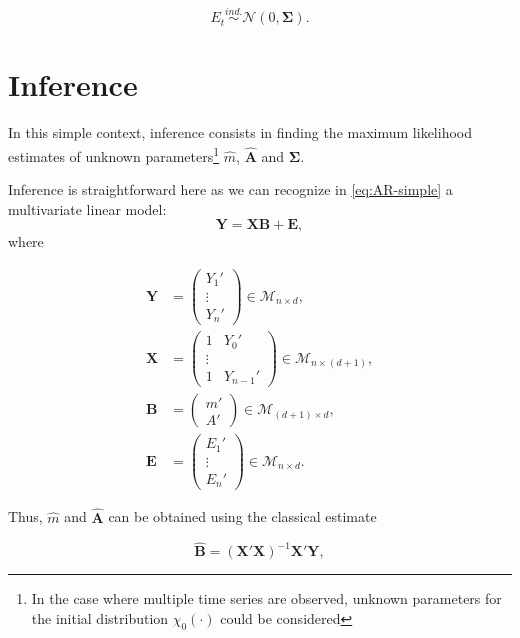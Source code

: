 \documentclass[]{book}
\begin{document}
\begin{equation*}
E_t \overset{ind.}{\sim} \mathcal{N}\left(0, \mathbf{\Sigma}\right).
\end{equation*}

\section{Inference}\label{inference}

In this simple context, inference consists in finding the maximum
likelihood estimates of unknown
parameters\footnote{In the case where multiple time series are observed, unknown parameters for the initial distribution $\chi_0(\cdot)$ could be considered}
\(\hat{m}\), \(\hat{\mathbf{A}}\) and \(\mathbf{\Sigma}\).

Inference is straightforward here as we can recognize in
\eqref{eq:AR-simple} a multivariate linear model:
\[\mathbf{Y} = \mathbf{XB} + \mathbf{E},\] where

\begin{align*}
\mathbf{Y} &= 
\begin{pmatrix}
Y_1'\\
\vdots\\
Y_n'
\end{pmatrix} \in \mathcal{M}_{n \times d},\\
\mathbf{X} &= 
\begin{pmatrix}
1 & Y_0'\\
\vdots\\
1 & Y_{n-1}'
\end{pmatrix} \in \mathcal{M}_{n \times (d+1)},\\
\mathbf{B} &= 
\begin{pmatrix}
m'\\
A'
\end{pmatrix} \in \mathcal{M}_{(d + 1) \times d},\\
\mathbf{E} &= 
\begin{pmatrix}
E_1'\\
\vdots\\
E_n'
\end{pmatrix} \in \mathcal{M}_{n \times d}.
\end{align*}

Thus, \(\hat{m}\) and \(\hat{\mathbf{A}}\) can be obtained using the
classical estimate

\begin{equation}
\hat{\mathbf{B}} = \left(\mathbf{X'X}\right)^{-1}\mathbf{X}'\mathbf{Y}, \label{eq:AR-simple-B-hat}
\end{equation}
\end{document}
